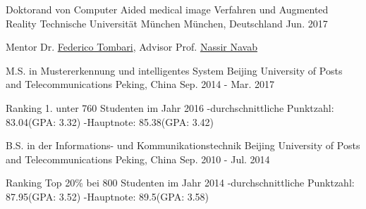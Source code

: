 



\begin{cventries}

\cventry
{Doktorand von Computer Aided medical image Verfahren und Augmented Reality} %
{Technische Universität München} %
{München, Deutschland} %
{Jun. 2017} %
{ %
\begin{cvitems}
\item {Mentor Dr. \href{http://campar.in.tum.de/Main/FedericoTombari}{Federico Tombari}, Advisor Prof. \href{http://campar.in.tum.de/Chair/ResearchIssueComputerVision}{Nassir Navab}}
\end{cvitems}
}


\cventry
{M.S. in Mustererkennung und intelligentes System} %
{Beijing University of Posts and Telecommunications} %
{Peking, China} %
{Sep. 2014 - Mar. 2017} %
{ %
\begin{cvitems}
\item {Ranking 1. unter 760 Studenten im Jahr 2016 -durchschnittliche Punktzahl: 83.04(GPA: 3.32) -Hauptnote: 85.38(GPA: 3.42)}
\end{cvitems}
}


\cventry
{B.S. in der Informations- und Kommunikationstechnik} %
{Beijing University of Posts and Telecommunications} %
{Peking, China} %
{Sep. 2010 - Jul. 2014} %
{ %
\begin{cvitems}
\item {Ranking Top 20\% bei 800 Studenten im Jahr 2014 -durchschnittliche Punktzahl: 87.95(GPA: 3.52) -Hauptnote: 89.5(GPA: 3.58)}
\end{cvitems}
}%

\end{cventries}
